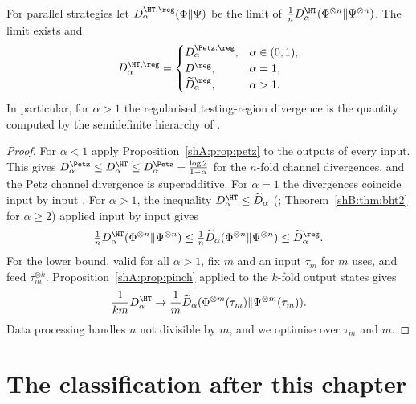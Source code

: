 \begin{theorem}\label{shA:thm:htreg}
For parallel strategies let $D^{\HT,\reg}_\alpha(\Phi\|\Psi)$ be the limit of $\frac1nD^\HT_\alpha(\Phi^{\otimes n}\|\Psi^{\otimes n})$. The limit exists and
\[
D^{\HT,\reg}_\alpha=\begin{cases}D^{\Petz,\reg}_\alpha, & \alpha\in(0,1),\\ D^\reg, & \alpha=1,\\ \widetilde D^\reg_\alpha, & \alpha>1 .\end{cases}
\]
In particular, for $\alpha>1$ the regularised testing-region divergence is the quantity computed by the semidefinite hierarchy of \cite{FawziFawzi2021}.
\end{theorem}

\begin{proof}
For $\alpha<1$ apply Proposition~\ref{shA:prop:petz} to the outputs of every input. This gives $D^\Petz_\alpha\le D^\HT_\alpha\le D^\Petz_\alpha+\frac{\log2}{1-\alpha}$ for the $n$-fold channel divergences, and the Petz channel divergence is superadditive. For $\alpha=1$ the divergences coincide input by input \cite{Frenkel2023}. For $\alpha>1$, the inequality $D^\HT_\alpha\le\widetilde D_\alpha$ (\cite{LiuHircheCheng2025}; Theorem~\ref{shB:thm:bht2} for $\alpha\ge2$) applied input by input gives
\[
\tfrac1nD^\HT_\alpha(\Phi^{\otimes n}\|\Psi^{\otimes n})\le\tfrac1n\widetilde D_\alpha(\Phi^{\otimes n}\|\Psi^{\otimes n})\le\widetilde D^\reg_\alpha .
\] For the lower bound, valid for all $\alpha>1$, fix $m$ and an input $\tau_m$ for $m$ uses, and feed $\tau_m^{\otimes k}$. Proposition~\ref{shA:prop:pinch} applied to the $k$-fold output states gives
\[
\frac1{km}D^\HT_\alpha\to\frac1m\widetilde D_\alpha(\Phi^{\otimes m}(\tau_m)\|\Psi^{\otimes m}(\tau_m)).
\]
Data processing handles $n$ not divisible by $m$, and we optimise over $\tau_m$ and $m$.
\end{proof}

\section{The classification after this chapter}\label{shA:sec:summary}

